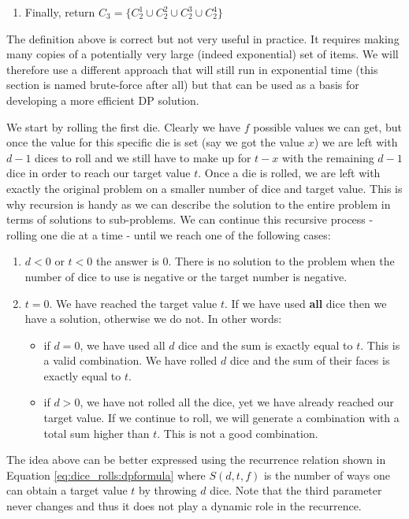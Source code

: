 \begin{enumerate}
	\item  Finally, return $C_3 = \{C_2^1 \cup  C_2^2 \cup C_2^3 \cup C_2^4\}$
	
\end{enumerate}


The definition above is correct but not very useful in practice. It requires making many copies
of a potentially very large (indeed exponential) set of items. We will therefore use a different approach that will still run in exponential time (this section is named brute-force after all) but that can be used as a basis for developing a more efficient DP solution.

We start by rolling the first die. Clearly we have $f$ possible values we can get, but
once the value for this specific die is set (say we got the value $x$)  we are left with $d-1$ dices
to roll and we still have to make up for $t-x$ with the remaining $d-1$ dice in order to reach our target value
$t$. 
Once a die is rolled, we are left with exactly the original problem on a smaller number of dice
and target value. 
This is why recursion is handy as we can describe the solution to the entire problem in terms of solutions to
sub-problems.
We can continue this recursive process - rolling one die at a time - until we reach one of the following cases:
\begin{enumerate}
	\item $d<0$ or $t<0$ the answer is $0$. There is no solution to the problem when the number of
		dice to use is negative or the target number is negative.
	\item $t=0$. We have reached the target value $t$. If we have used \textbf{all} dice then we
		have a solution, otherwise we do not. In other words:
	\begin{itemize}
		\item  if $d=0$, we have used all $d$ dice and the sum is exactly equal to $t$. This is a
		valid combination. We have rolled $d$ dice and the sum of their faces is exactly equal to
		$t$.
		\item if $d>0$, we have not rolled all the dice, yet we have already reached our target
		value. If we continue to roll, we will generate a combination with a total sum higher than
		$t$. This is not a good combination.
	\end{itemize}
\end{enumerate}

The idea above can be better expressed using the recurrence relation shown in Equation
\ref{eq:dice_rolls:dpformula} where $S(d,t,f)$ is the number of ways one can obtain a target value
$t$ by throwing $d$ dice. Note that the third parameter never changes and thus it does not play a
dynamic role in the recurrence. 

